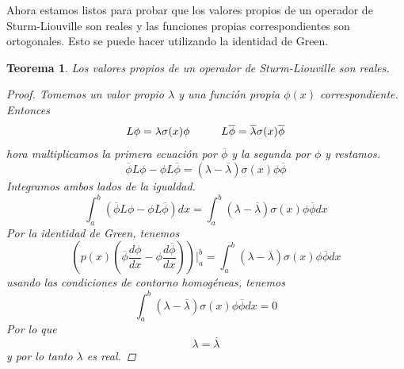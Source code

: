 \documentclass[11pt]{book}
\theoremstyle{plain}
\newtheorem{teo}[proposición]{Teorema}
\theoremstyle{definition}
\begin{document}
    Ahora estamos listos para probar que los valores propios de un operador de Sturm-Liouville son reales y las funciones propias correspondientes son ortogonales. Esto se puede hacer utilizando la identidad de Green.
    \begin{teo}
        Los valores propios de un operador de Sturm-Liouville son reales.
        \begin{proof}
            Tomemos un valor propio $\lambda$ y una función propia $\phi(x)$ correspondiente. Entonces
            \[
                L\phi = \lambda \sigma(x)\phi \hspace{10mm} L\overline{\phi} = \overline{\lambda} \sigma(x)\overline{\phi}
            \]
            hora multiplicamos la primera ecuación por $\overline{\phi}$ y la segunda por $\phi$ y restamos.
            \[
                \overline{\phi}L\phi - \phi L\overline{\phi} = (\lambda - \overline{\lambda})\sigma(x)\phi\overline{\phi}
            \]
            Integramos ambos lados de la igualdad.
            \[
                \int_{a}^{b} \left(\overline{\phi}L\phi - \phi L\overline{\phi}\right)dx = \int_{a}^{b} (\lambda - \overline{\lambda})\sigma(x)\phi\overline{\phi}dx
            \]
            Por la identidad de Green, tenemos
            \[
                \left(p(x)\left(\overline{\phi}\frac{d\phi}{dx} - \phi\frac{d\overline{\phi}}{dx}\right)\right)|_{a}^{b} = \int_{a}^{b} (\lambda - \overline{\lambda})\sigma(x)\phi\overline{\phi}dx
            \]
            usando las condiciones de contorno homogéneas, tenemos
            \[
                \int_{a}^{b} (\lambda - \overline{\lambda})\sigma(x)\phi\overline{\phi}dx = 0
            \]
            Por lo que
            \[
                \lambda = \overline{\lambda}
            \]
            y por lo tanto $\lambda$ es real.
        \end{proof}
    \end{teo}
\end{document}
